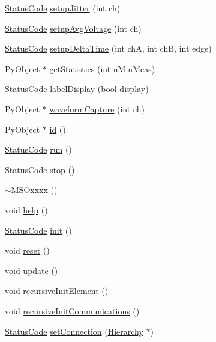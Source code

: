 \begin{DoxyCompactItemize}
\hyperlink{classStatusCode}{Status\+Code} \hyperlink{classMSOxxxx_a829d87b0aa03840ebfe0a44e560c7f63}{setup\+Jitter} (int ch)
\item 
\hyperlink{classStatusCode}{Status\+Code} \hyperlink{classMSOxxxx_af1524bb099b5e559931704d13a1f1126}{setup\+Avg\+Voltage} (int ch)
\item 
\hyperlink{classStatusCode}{Status\+Code} \hyperlink{classMSOxxxx_abbbebb3e4649c866bcdd853627f12b5d}{setup\+Delta\+Time} (int chA, int chB, int edge)
\item 
Py\+Object $\ast$ \hyperlink{classMSOxxxx_a38f15b6ad8bc3cdc1836d784b3e96c59}{get\+Statistics} (int n\+Min\+Meas)
\item 
\hyperlink{classStatusCode}{Status\+Code} \hyperlink{classMSOxxxx_ade4192f09f150be8b9c7c081ce1a1870}{label\+Display} (bool display)
\item 
Py\+Object $\ast$ \hyperlink{classMSOxxxx_aed78c680bcec9e14a88eedf7b291518c}{waveform\+Capture} (int ch)
\item 
Py\+Object $\ast$ \hyperlink{classMSOxxxx_a0f14b23d31d8e7647184e99a89600cc3}{id} ()
\item 
\hyperlink{classStatusCode}{Status\+Code} \hyperlink{classMSOxxxx_a96ca34744e5a6b611aaf9ae7910f00cd}{run} ()
\item 
\hyperlink{classStatusCode}{Status\+Code} \hyperlink{classMSOxxxx_a4ec991c3850a652fbe9a1709cab7001b}{stop} ()
\item 
\hyperlink{classMSOxxxx_a567c156d78fbeab9d61bf8ec9acac851}{$\sim$\+M\+S\+Oxxxx} ()
\item 
void \hyperlink{classMSOxxxx_a8c22ff23297ada963eaf12b6e0b62017}{help} ()
\item 
\hyperlink{classStatusCode}{Status\+Code} \hyperlink{classMSOxxxx_ac14ed16b221798423e7c3b5e285006b5}{init} ()
\item 
void \hyperlink{classMSOxxxx_a26f03d21da556529155898dc115c301c}{reset} ()
\item 
void \hyperlink{classMSOxxxx_a09452d6e75cd9adfaec93606fbb998dc}{update} ()
\item 
void \hyperlink{classElement_a3c0abcb36f8906688bb7e32608df7086}{recursive\+Init\+Element} ()
\item 
void \hyperlink{classElement_a82119ed37dff76508a2746a853ec35ba}{recursive\+Init\+Communications} ()
\item 
\hyperlink{classStatusCode}{Status\+Code} \hyperlink{classElement_ab476b4b1df5954141ceb14f072433b89}{set\+Connection} (\hyperlink{classHierarchy}{Hierarchy} $\ast$)
\item 

\end{DoxyCompactItemize}
